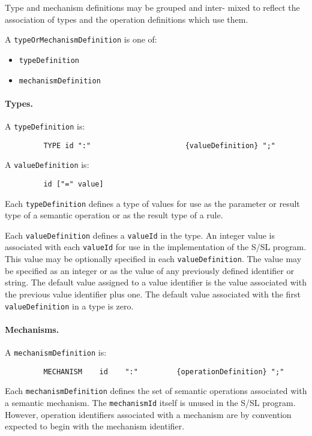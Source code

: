 Type and mechanism definitions may be grouped and  inter-
mixed  to reflect the association of types and the operation
definitions which use them.

A {\tt typeOrMechanismDefinition} is one of:
\begin{itemize}
\item {\tt typeDefinition}
\item {\tt mechanismDefinition}
\end{itemize}





\paragraph{Types.}

A {\tt typeDefinition} is:
\begin{verbatim}
         TYPE id ":"                      {valueDefinition} ";"
\end{verbatim}


A {\tt valueDefinition} is:
\begin{verbatim}
         id ["=" value]
\end{verbatim}


Each {\tt typeDefinition} defines a type of values for  use  as
the  parameter  or result type of a semantic operation or as
the result type of a rule.

Each {\tt valueDefinition} defines a {\tt valueId} in the  type. An
integer value is associated with each {\tt valueId} for use in the
implementation of the  S/SL  program.   This  value  may  be
optionally specified in each {\tt valueDefinition}.  The value may
be specified as an integer or as the value of any previously
defined identifier or string.  The default value assigned to
a value identifier is the value associated with the previous
value  identifier  plus  one.   The default value associated
with the first {\tt valueDefinition} in a type is zero.


\paragraph{Mechanisms.}

A {\tt mechanismDefinition} is:
\begin{verbatim}
         MECHANISM    id    ":"         {operationDefinition} ";"
\end{verbatim}

Each {\tt mechanismDefinition}  defines  the  set        of semantic
operations associated with a semantic mechanism.  The 
{\tt mechanismId} itself is unused in the S/SL program.  However, 
operation identifiers associated with a mechanism are by 
convention expected to begin with the mechanism identifier.

